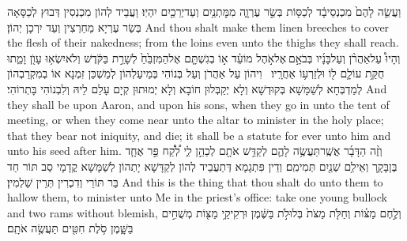 {וַעֲשֵׂ֤ה לָהֶם֙ מִכְנְסֵי\maqqaf בָ֔ד לְכַסּ֖וֹת בְּשַׂ֣ר עֶרְוָ֑ה מִמׇּתְנַ֥יִם וְעַד\maqqaf יְרֵכַ֖יִם יִהְיֽוּ׃}
{וַעֲבֵיד לְהוֹן מִכְנְסִין דְּבוּץ לְכַסָּאָה בְּשַׂר עֶרְיָא מֵחַרְצִין וְעַד יִרְכָן יְהוֹן׃}
{And thou shalt make them linen breeches to cover the flesh of their nakedness; from the loins even unto the thighs they shall reach.}{}
{וְהָיוּ֩ עַל\maqqaf אַהֲרֹ֨ן וְעַל\maqqaf בָּנָ֜יו בְּבֹאָ֣ם \legarmeh  אֶל\maqqaf אֹ֣הֶל מוֹעֵ֗ד א֣וֹ בְגִשְׁתָּ֤ם אֶל\maqqaf הַמִּזְבֵּ֙חַ֙ לְשָׁרֵ֣ת בַּקֹּ֔דֶשׁ וְלֹא\maqqaf יִשְׂא֥וּ עָוֺ֖ן וָמֵ֑תוּ חֻקַּ֥ת עוֹלָ֛ם ל֖וֹ וּלְזַרְע֥וֹ אַחֲרָֽיו׃ \setuma }
{וִיהוֹן עַל אַהֲרֹן וְעַל בְּנוֹהִי בְּמֵיעַלְהוֹן לְמַשְׁכַּן זִמְנָא אוֹ בְמִקְרַבְהוֹן לְמַדְבְּחָא לְשַׁמָּשָׁא בְּקוּדְשָׁא וְלָא יְקַבְּלוּן חוֹבָא וְלָא יְמוּתוּן קְיָם עָלַם לֵיהּ וְלִבְנוֹהִי בָּתְרוֹהִי׃}
{And they shall be upon Aaron, and upon his sons, when they go in unto the tent of meeting, or when they come near unto the altar to minister in the holy place; that they bear not iniquity, and die; it shall be a statute for ever unto him and unto his seed after him.}{}
\newperek
{}
{וְזֶ֨ה הַדָּבָ֜ר אֲשֶֽׁר\maqqaf תַּעֲשֶׂ֥ה לָהֶ֛ם לְקַדֵּ֥שׁ אֹתָ֖ם לְכַהֵ֣ן לִ֑י לְ֠קַ֠ח פַּ֣ר אֶחָ֧ד בֶּן\maqqaf בָּקָ֛ר וְאֵילִ֥ם שְׁנַ֖יִם תְּמִימִֽם׃}
{וְדֵין פִּתְגָמָא דְּתַעֲבֵיד לְהוֹן לְקַדָּשָׁא יָתְהוֹן לְשַׁמָּשָׁא קֳדָמָי סַב תּוֹר חַד בַּר תּוֹרֵי וְדִכְרִין תְּרֵין שַׁלְמִין׃}
{And this is the thing that thou shalt do unto them to hallow them, to minister unto Me in the priest’s office: take one young bullock and two rams without blemish,}{}
{וְלֶ֣חֶם מַצּ֗וֹת וְחַלֹּ֤ת מַצֹּת֙ בְּלוּלֹ֣ת בַּשֶּׁ֔מֶן וּרְקִיקֵ֥י מַצּ֖וֹת מְשֻׁחִ֣ים בַּשָּׁ֑מֶן סֹ֥לֶת חִטִּ֖ים תַּעֲשֶׂ֥ה אֹתָֽם׃}
